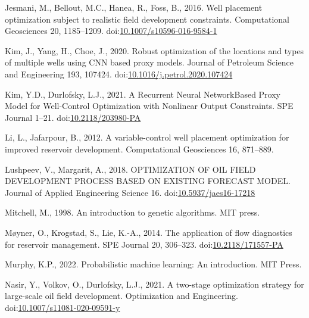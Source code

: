 \documentclass[]{elsarticle} %
\newlength{\cslhangindent}
\newenvironment{CSLReferences}[2] %
 {%
  \setlength{\parindent}{0pt}
  \ifodd #1 \everypar{\setlength{\hangindent}{\cslhangindent}}\ignorespaces\fi
  \ifnum #2 > 0
  \setlength{\parskip}{#2\baselineskip}
  \fi
 }%
 {}
\begin{document}
\begin{eqution}
\begin{CSLReferences}{1}{0}
\leavevmode{}%
Jesmani, M., Bellout, M.C., Hanea, R., Foss, B., 2016. Well placement optimization subject to realistic field development constraints. Computational Geosciences 20, 1185--1209. doi:\href{https://doi.org/10.1007/s10596-016-9584-1}{10.1007/s10596-016-9584-1}

\leavevmode{}%
Kim, J., Yang, H., Choe, J., 2020. Robust optimization of the locations and types of multiple wells using CNN based proxy models. Journal of Petroleum Science and Engineering 193, 107424. doi:\href{https://doi.org/10.1016/j.petrol.2020.107424}{10.1016/j.petrol.2020.107424}

\leavevmode{}%
Kim, Y.D., Durlofsky, L.J., 2021. A Recurrent Neural Network{\textendash}Based Proxy Model for Well-Control Optimization with Nonlinear Output Constraints. SPE Journal 1--21. doi:\href{https://doi.org/10.2118/203980-PA}{10.2118/203980-PA}

\leavevmode{}%
Li, L., Jafarpour, B., 2012. A variable-control well placement optimization for improved reservoir development. Computational Geosciences 16, 871--889.

\leavevmode{}%
Lushpeev, V., Margarit, A., 2018. OPTIMIZATION OF OIL FIELD DEVELOPMENT PROCESS BASED ON EXISTING FORECAST MODEL. Journal of Applied Engineering Science 16. doi:\href{https://doi.org/10.5937/jaes16-17218}{10.5937/jaes16-17218}

\leavevmode{}%
Mitchell, M., 1998. An introduction to genetic algorithms. MIT press.

\leavevmode{}%
Møyner, O., Krogstad, S., Lie, K.-A., 2014. The application of flow diagnostics for reservoir management. SPE Journal 20, 306--323. doi:\href{https://doi.org/10.2118/171557-PA}{10.2118/171557-PA}

\leavevmode{}%
Murphy, K.P., 2022. Probabilistic machine learning: An introduction. MIT Press.

\leavevmode{}%
Nasir, Y., Volkov, O., Durlofsky, L.J., 2021. A two-stage optimization strategy for large-scale oil field development. Optimization and Engineering. doi:\href{https://doi.org/10.1007/s11081-020-09591-y}{10.1007/s11081-020-09591-y}


\end{CSLReferences}
\end{eqution}
\end{document}
